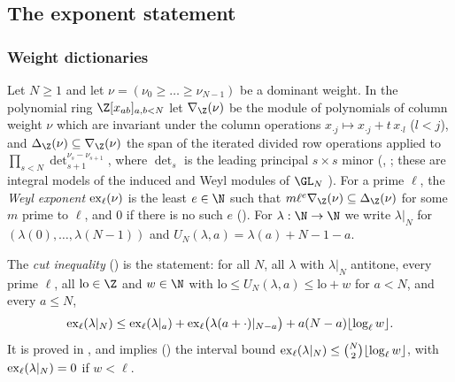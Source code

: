 \subsection{The exponent statement}\label{sec:pf:onto2:exp}

\subsubsection{Weight dictionaries}\label{sec:pf:onto2:dict}

\begin{definition}\label{pf:onto2:weylexp}
Let $N\ge1$ and let $\nu=(\nu_0\ge\dots\ge\nu_{N-1})$ be a dominant weight. In the polynomial ring $\Z[x_{ab}]_{a,b<N}$ let
$\nabla_\Z(\nu)$ be the module of polynomials of column weight $\nu$ which are invariant under the column operations
$x_{\cdot j}\mapsto x_{\cdot j}+t\,x_{\cdot l}$ ($l<j$), and $\Delta_\Z(\nu)\subseteq\nabla_\Z(\nu)$ the span of the iterated divided row
operations applied to $\prod_{s<N}\det_{s+1}^{\nu_s-\nu_{s+1}}$, where $\det_s$ is the leading principal $s\times s$ minor
(, ; these are integral models
of the induced and Weyl modules of $\GL_N$ \cite{Jantzen2003}). For a prime $\ell$, the \emph{Weyl exponent} $\operatorname{ex}_\ell(\nu)$ is
the least $e\in\N$ such that $m\ell^e\nabla_\Z(\nu)\subseteq\Delta_\Z(\nu)$ for some $m$ prime to $\ell$, and $0$ if there is no such
$e$ (). For $\lambda:\N\to\N$ we write $\lambda|_N$ for $(\lambda(0),\dots,\lambda(N-1))$
and $U_N(\lambda,a)=\lambda(a)+N-1-a$.
\end{definition}

The \emph{cut inequality} () is the statement: for all $N$, all $\lambda$ with
$\lambda|_N$ antitone, every prime $\ell$, all $\mathrm{lo}\in\Z$ and $w\in\N$ with $\mathrm{lo}\le U_N(\lambda,a)\le\mathrm{lo}+w$ for
$a<N$, and every $a\le N$,
\begin{equation}\label{eq:pf:onto2:excut}
\operatorname{ex}_\ell(\lambda|_N)\le\operatorname{ex}_\ell(\lambda|_a)+\operatorname{ex}_\ell\bigl(\lambda(a+\cdot)|_{N-a}\bigr)+a(N-a)\lfloor\log_\ell w\rfloor .
\end{equation}
It is proved in , and implies ()
the interval bound $\operatorname{ex}_\ell(\lambda|_N)\le\binom N2\lfloor\log_\ell w\rfloor$, with $\operatorname{ex}_\ell(\lambda|_N)=0$ if $w<\ell$.

